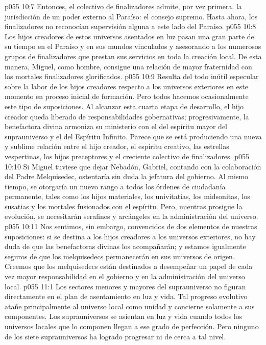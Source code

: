 \vs p055 10:7 \pc Entonces, el colectivo de finalizadores admite, por vez primera, la jurisdicción de un poder externo al Paraíso: el consejo supremo. Hasta ahora, los finalizadores no reconocían supervisión alguna a este lado del Paraíso.
\vs p055 10:8 Los hijos creadores de estos universos asentados en luz pasan una gran parte de su tiempo en el Paraíso y en sus mundos vinculados y asesorando a los numerosos grupos de finalizadores que prestan sus servicios en toda la creación local. De esta manera, Miguel, como hombre, consigue una relación de mayor fraternidad con los mortales finalizadores glorificados.
\vs p055 10:9 \pc Resulta del todo inútil especular sobre la labor de los hijos creadores respecto a los universos exteriores en este momento en proceso inicial de formación. Pero todos hacemos ocasionalmente este tipo de suposiciones. Al alcanzar esta cuarta etapa de desarrollo, el hijo creador queda liberado de responsabilidades gobernativas; progresivamente, la benefactora divina armoniza su ministerio con el del espíritu mayor del suprauniverso y el del Espíritu Infinito. Parece que se está produciendo una nueva y sublime relación entre el hijo creador, el espíritu creativo, las estrellas vespertinas, los hijos preceptores y el creciente colectivo de finalizadores.
\vs p055 10:10 Si Miguel tuviese que dejar Nebadón, Gabriel, contando con la colaboración del Padre Melquisedec, ostentaría sin duda la jefatura del gobierno. Al mismo tiempo, se otorgaría un nuevo rango a todos los órdenes de ciudadanía permanente, tales como los hijos materiales, los univitatias, los midsonitas, los susatias y los mortales fusionados con el espíritu. Pero, mientras prosigue la evolución, se necesitarán serafines y arcángeles en la administración del universo.
\vs p055 10:11 Nos sentimos, sin embargo, convencidos de dos elementos de nuestras suposiciones: si se destina a los hijos creadores a los universos exteriores, no hay duda de que las benefactoras divinas los acompañarán; y estamos igualmente seguros de que los melquisedecs permanecerán en sus universos de origen. Creemos que los melquisedecs están destinados a desempeñar un papel de cada vez mayor responsabilidad en el gobierno y en la administración del universo local.
\vs p055 11:1 Los sectores menores y mayores del suprauniverso no figuran directamente en el plan de asentamiento en luz y vida. Tal progreso evolutivo atañe principalmente al universo local como unidad y concierne solamente a sus componentes. Los suprauniversos se asientan en luz y vida cuando todos los universos locales que lo componen llegan a ese grado de perfección. Pero ninguno de los siete suprauniversos ha logrado progresar ni de cerca a tal nivel.
